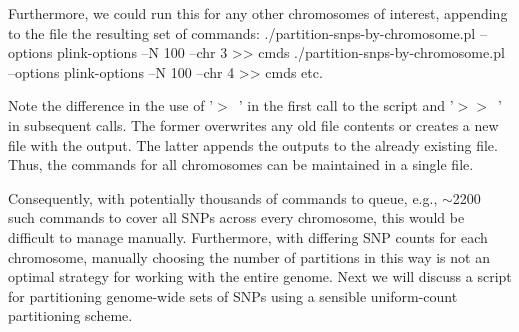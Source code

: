 Furthermore, we could run this for any other chromosomes of interest, appending to the file the resulting set of commands:
\startSTDIN
./partition-snps-by-chromosome.pl --options plink-options --N 100 --chr 3 >> cmds
\stopSTDIN
\startSTDIN
./partition-snps-by-chromosome.pl --options plink-options --N 100 --chr 4 >> cmds
\stopSTDIN
etc.

Note the difference in the use of '$>$~' in the first call to the script and '$>>$~' in subsequent calls.  
The former overwrites any old file contents or creates a new file with the output.  
The latter appends the outputs to the already existing file.  Thus, the commands for all chromosomes can be maintained in a single file.

Consequently, with potentially thousands of commands to queue, 
e.g., $\sim$2200 such commands to cover all SNPs across every chromosome, 
this would be difficult to manage manually.
Furthermore, with differing SNP counts for each chromosome, manually choosing the number of partitions
in this way is not an optimal strategy for working with the entire genome.
Next we will discuss a script for partitioning genome-wide sets of SNPs using a sensible uniform-count partitioning scheme.



\stopsubsubject

\endinput
